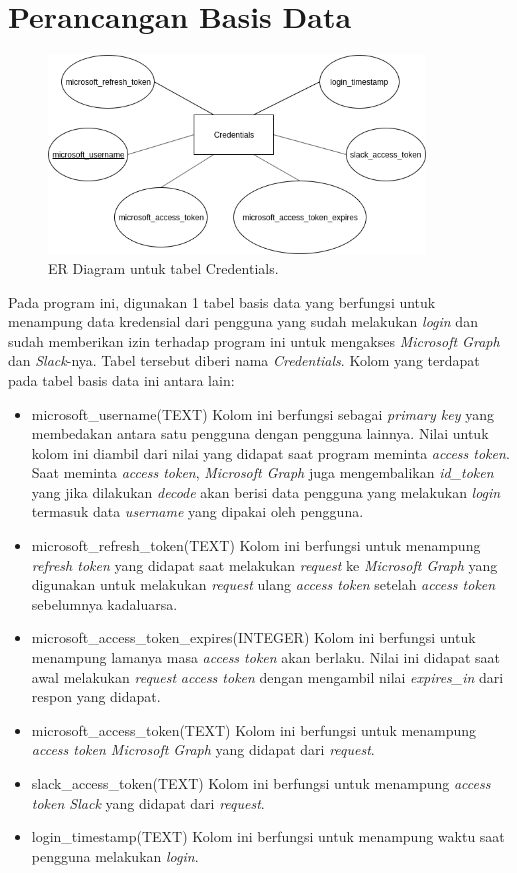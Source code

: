 \section{Perancangan Basis Data}
\begin{figure}[h]
  \includegraphics[width=10cm]{./Gambar/ERD.png}
  \centering
  \caption{ER Diagram untuk tabel Credentials.}
  \label{fig:erd}
\end{figure}
Pada program ini, digunakan 1 tabel basis data yang berfungsi untuk menampung data kredensial dari pengguna yang sudah melakukan \textit{login} dan sudah memberikan izin terhadap program ini untuk mengakses \textit{Microsoft Graph} dan \textit{Slack}-nya. Tabel tersebut diberi nama \textit{Credentials}. Kolom yang terdapat pada tabel basis data ini antara lain:
\begin{itemize}
    \item microsoft\_username(TEXT)
    Kolom ini berfungsi sebagai \textit{primary key} yang membedakan antara satu pengguna dengan pengguna lainnya. Nilai untuk kolom ini diambil dari nilai yang didapat saat program meminta \textit{access token}. Saat meminta \textit{access token}, \textit{Microsoft Graph} juga mengembalikan \textit{id\_token} yang jika dilakukan \textit{decode} akan berisi data pengguna yang melakukan \textit{login} termasuk data \textit{username} yang dipakai oleh pengguna. 
    \item microsoft\_refresh\_token(TEXT)
    Kolom ini berfungsi untuk menampung \textit{refresh token} yang didapat saat melakukan \textit{request} ke \textit{Microsoft Graph} yang digunakan untuk melakukan \textit{request} ulang \textit{access token} setelah \textit{access token} sebelumnya kadaluarsa. 
    \item microsoft\_access\_token\_expires(INTEGER)
    Kolom ini berfungsi untuk menampung lamanya masa \textit{access token} akan berlaku. Nilai ini didapat saat awal melakukan \textit{request} \textit{access token} dengan mengambil nilai \textit{expires\_in} dari respon yang didapat. 
    \item microsoft\_access\_token(TEXT)
    Kolom ini berfungsi untuk menampung \textit{access token Microsoft Graph} yang didapat dari \textit{request}. 
    \item slack\_access\_token(TEXT)
    Kolom ini berfungsi untuk menampung \textit{access token Slack} yang didapat dari \textit{request}. 
    \item login\_timestamp(TEXT)
    Kolom ini berfungsi untuk menampung waktu saat pengguna melakukan \textit{login}. 
\end{itemize}

